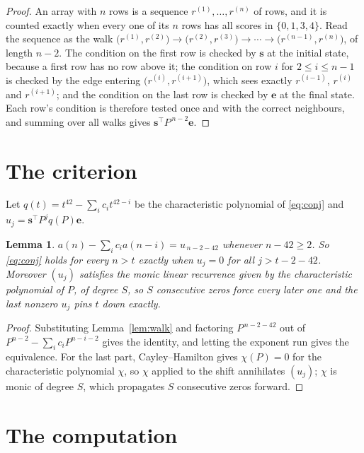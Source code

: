 \documentclass[11pt,a4paper]{article}
\theoremstyle{plain}
\newtheorem{lemma}[theorem]{Lemma}
\theoremstyle{definition}
\begin{document}
\begin{proof}
An array with $n$ rows is a sequence $r^{(1)},\dots,r^{(n)}$ of rows, and it is counted
exactly when every one of its $n$ rows has all scores in $\{0,1,3,4\}$. Read the sequence as the
walk $\bigl(r^{(1)},r^{(2)}\bigr)\to\bigl(r^{(2)},r^{(3)}\bigr)\to\cdots\to
\bigl(r^{(n-1)},r^{(n)}\bigr)$, of length $n-2$. The condition on the first row is
checked by $\mathbf{s}$ at the initial state, because a first row has no row above it; the
condition on row $i$ for $2\le i\le n-1$ is checked by the edge entering
$\bigl(r^{(i)},r^{(i+1)}\bigr)$, which sees exactly $r^{(i-1)}$, $r^{(i)}$ and
$r^{(i+1)}$; and the condition on the last row is checked by $\mathbf{e}$ at the final
state. Each row's condition is therefore tested once and with the correct neighbours, and
summing over all walks gives $\mathbf{s}^{\!\top}P^{\,n-2}\mathbf{e}$.
\end{proof}

\section{The criterion}

Let $q(t)=t^{42}-\sum_i c_i t^{42-i}$ be the characteristic polynomial of
\eqref{eq:conj} and $u_j=\mathbf{s}^{\!\top}P^{j}q(P)\mathbf{e}$.

\begin{lemma}\label{lem:crit}
$a(n)-\sum_i c_i a(n-i)=u_{\,n-2-42}$ whenever $n-42\ge2$. So \eqref{eq:conj}
holds for every $n>t$ exactly when $u_j=0$ for all $j>t-2-42$. Moreover $(u_j)$
satisfies the monic linear recurrence given by the characteristic polynomial of $P$, of
degree $S$, so $S$ consecutive zeros force every later one and the last nonzero $u_j$ pins
$t$ down exactly.
\end{lemma}

\begin{proof}
Substituting Lemma~\ref{lem:walk} and factoring $P^{\,n-2-42}$ out of
$P^{n-2}-\sum_i c_i P^{n-i-2}$ gives the identity, and letting the exponent run gives the
equivalence. For the last part, Cayley--Hamilton gives $\chi(P)=0$ for the characteristic
polynomial $\chi$, so $\chi$ applied to the shift annihilates $(u_j)$; $\chi$ is monic of
degree $S$, which propagates $S$ consecutive zeros forward.
\end{proof}

\section{The computation}
\end{document}
